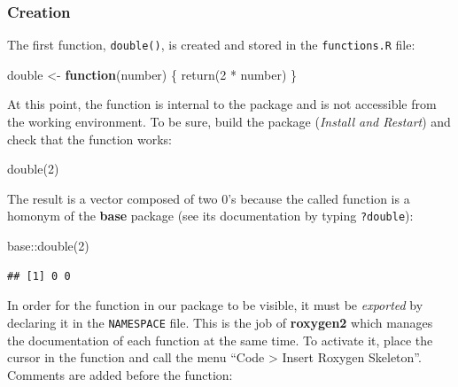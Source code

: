 \documentclass[
  12pt,
  american,
  a4paper,
  extrafontsizes,onecolumn,openright
  ]{memoir}
\newenvironment{Shaded}{\begin{snugshade}}{\end{snugshade}}
\newcommand{\ControlFlowTok}[1]{\textcolor[rgb]{0.13,0.29,0.53}{\textbf{#1}}}
\newcommand{\DecValTok}[1]{\textcolor[rgb]{0.00,0.00,0.81}{#1}}
\newcommand{\FunctionTok}[1]{\textcolor[rgb]{0.00,0.00,0.00}{#1}}
\newcommand{\NormalTok}[1]{#1}
\newcommand{\OtherTok}[1]{\textcolor[rgb]{0.56,0.35,0.01}{#1}}
\newcommand{\SpecialCharTok}[1]{\textcolor[rgb]{0.00,0.00,0.00}{#1}}
\begin{document}
\hypertarget{creation-1}{%
\subsubsection{Creation}\label{creation-1}}

The first function, \texttt{double()}, is created and stored in the \texttt{functions.R} file:

\scriptsize

\begin{Shaded}
\begin{Highlighting}[]
\NormalTok{double }\OtherTok{\textless{}{-}} \ControlFlowTok{function}\NormalTok{(number) \{}
    \FunctionTok{return}\NormalTok{(}\DecValTok{2} \SpecialCharTok{*}\NormalTok{ number)}
\NormalTok{\}}
\end{Highlighting}
\end{Shaded}

\normalsize

At this point, the function is internal to the package and is not accessible from the working environment.
To be sure, build the package (\emph{Install and Restart}) and check that the function works:

\scriptsize

\begin{Shaded}
\begin{Highlighting}[]
\FunctionTok{double}\NormalTok{(}\DecValTok{2}\NormalTok{)}
\end{Highlighting}
\end{Shaded}

\normalsize

The result is a vector composed of two 0's because the called function is a homonym of the \textbf{base} package (see its documentation by typing \texttt{?double}):

\scriptsize

\begin{Shaded}
\begin{Highlighting}[]
\NormalTok{base}\SpecialCharTok{::}\FunctionTok{double}\NormalTok{(}\DecValTok{2}\NormalTok{)}
\end{Highlighting}
\end{Shaded}

\begin{verbatim}
## [1] 0 0
\end{verbatim}

\normalsize

In order for the function in our package to be visible, it must be \emph{exported} by declaring it in the \texttt{NAMESPACE} file.
This is the job of \textbf{roxygen2} which manages the documentation of each function at the same time.
To activate it, place the cursor in the function and call the menu \enquote{Code \textgreater{} Insert Roxygen Skeleton}.
Comments are added before the function:
\end{document}
